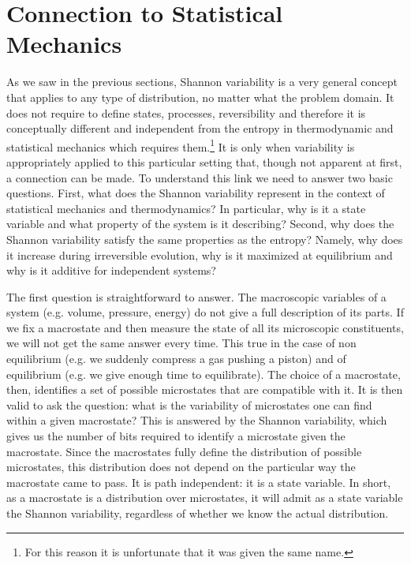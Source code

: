 \documentclass{article}
\begin{document}
\section{Connection to Statistical Mechanics\label{csm}}

As we saw in the previous sections, Shannon variability is a very general concept that applies to any type of distribution, no matter what the problem domain. It does not require to define states, processes, reversibility and therefore it is conceptually different and independent from the entropy in thermodynamic and statistical mechanics which requires them.\footnote{For this reason it is unfortunate that it was given the same name.} It is only when variability is appropriately applied to this particular setting that, though not apparent at first, a connection can be made. To understand this link we need to answer two basic questions. First, what does the Shannon variability represent in the context of statistical mechanics and thermodynamics? In particular, why is it a state variable and what property of the system is it describing? Second, why does the Shannon variability satisfy the same properties as the entropy? Namely, why does it increase during irreversible evolution, why is it maximized at equilibrium and why is it additive for independent systems?

The first question is straightforward to answer. The macroscopic variables of a system (e.g. volume, pressure, energy) do not give a full description of its parts. If we fix a macrostate and then measure the state of all its microscopic constituents, we will not get the same answer every time. This true in the case of non equilibrium (e.g. we suddenly compress a gas pushing a piston) and of equilibrium (e.g. we give enough time to equilibrate). The choice of a macrostate, then, identifies a set of possible microstates that are compatible with it. It is then valid to ask the question: what is the variability of microstates one can find within a given macrostate? This is answered by the Shannon variability, which gives us the number of bits required to identify a microstate given the macrostate. Since the macrostates fully define the distribution of possible microstates, this distribution does not depend on the particular way the macrostate came to pass. It is path independent: it is a state variable. In short, as a macrostate is a distribution over microstates, it will admit as a state variable the Shannon variability, regardless of whether we know the actual distribution.
\end{document}
